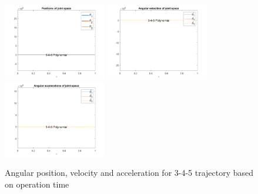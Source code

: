 \documentclass[conference]{IEEEtran}
\begin{document}
\begin{figure}[htbp]
    \centering
    \includegraphics[width=0.4\textwidth]{figures/prob5/theta_i/position_3-4-5 Polynomial.png}
    \includegraphics[width=0.4\textwidth]{figures/prob5/theta_i/velocity_3-4-5 Polynomial.png}
    \includegraphics[width=0.4\textwidth]{figures/prob5/theta_i/acceleration_3-4-5 Polynomial.png}
    \caption{Angular position, velocity and acceleration for 3-4-5 trajectory based on operation time}
    \label{fig:res4}
\end{figure}
\end{document}
